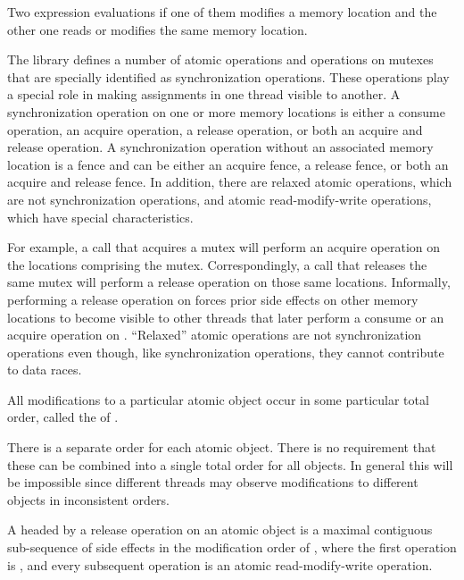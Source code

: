 \pnum
Two expression evaluations  if one of them modifies a memory
location and the other one reads or modifies the same
memory location.

\pnum
The library defines a number of atomic operations and
operations on mutexes that are specially identified as
synchronization operations. These operations play a special role in making
assignments in one thread visible to another. A synchronization operation on one
or more memory locations is either a consume operation, an acquire operation, a
release operation, or both an acquire and release operation. A synchronization
operation without an associated memory location is a fence and can be either an
acquire fence, a release fence, or both an acquire and release fence. In
addition, there are relaxed atomic operations, which are not synchronization
operations, and atomic read-modify-write operations, which have special
characteristics.
\begin{note}
For example, a call that acquires a mutex will
perform an acquire operation on the locations comprising the mutex.
Correspondingly, a call that releases the same mutex will perform a release
operation on those same locations. Informally, performing a release operation on
 forces prior
%
side effects on other memory locations to become visible
to other threads that later perform a consume or an acquire operation on
. ``Relaxed'' atomic operations are not synchronization operations even
though, like synchronization operations, they cannot contribute to data races.
\end{note}

\pnum
All modifications to a particular atomic object  occur in some
particular total order, called the  of .
\begin{note}
There is a separate order for each
atomic object. There is no requirement that these can be combined into a single
total order for all objects. In general this will be impossible since different
threads may observe modifications to different objects in inconsistent orders.
\end{note}

\pnum
A  headed
by a release operation  on an atomic object 
is a maximal contiguous sub-sequence of
%
side effects in the modification order of ,
where the first operation is , and
every subsequent operation is an atomic read-modify-write operation.

